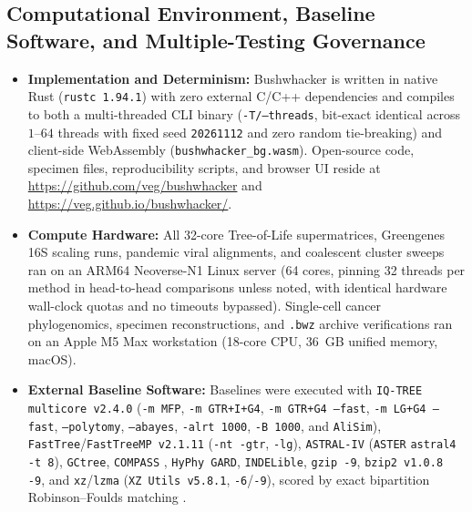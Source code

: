 \documentclass[12pt]{article}
\begin{document}
\subsection*{Computational Environment, Baseline Software, and Multiple-Testing Governance}

\begin{itemize}
    \item \textbf{Implementation and Determinism:} Bushwhacker is written in native Rust (\texttt{rustc 1.94.1}) with zero external C/C++ dependencies and compiles to both a multi-threaded CLI binary (\texttt{-T/--threads}, bit-exact identical across $1\text{--}64$ threads with fixed seed \texttt{20261112} and zero random tie-breaking) and client-side WebAssembly (\texttt{bushwhacker\_bg.wasm}). Open-source code, specimen files, reproducibility scripts, and browser UI reside at \url{https://github.com/veg/bushwhacker} and \url{https://veg.github.io/bushwhacker/}.
    \item \textbf{Compute Hardware:} All 32-core Tree-of-Life supermatrices, Greengenes 16S scaling runs, pandemic viral alignments, and coalescent cluster sweeps ran on an ARM64 Neoverse-N1 Linux server (64 cores, pinning 32 threads per method in head-to-head comparisons unless noted, with identical hardware wall-clock quotas and no timeouts bypassed). Single-cell cancer phylogenomics, specimen reconstructions, and \texttt{.bwz} archive verifications ran on an Apple M5 Max workstation (18-core CPU, 36~GB unified memory, macOS).
    \item \textbf{External Baseline Software:} Baselines were executed with \texttt{IQ-TREE multicore v2.4.0} (\texttt{-m MFP}, \texttt{-m GTR+I+G4}, \texttt{-m GTR+G4 --fast}, \texttt{-m LG+G4 --fast}, \texttt{--polytomy}, \texttt{--abayes}, \texttt{-alrt 1000}, \texttt{-B 1000}, and \texttt{AliSim}), \texttt{FastTree}/\texttt{FastTreeMP v2.1.11} (\texttt{-nt -gtr}, \texttt{-lg}), \texttt{ASTRAL-IV} (\texttt{ASTER} \texttt{astral4} \texttt{-t 8}), \texttt{GCtree}, \texttt{COMPASS} \cite{sollier2023compass,jahn2016tree}, \texttt{HyPhy GARD}, \texttt{INDELible}, \texttt{gzip -9}, \texttt{bzip2 v1.0.8 -9}, and \texttt{xz}/\texttt{lzma} (\texttt{XZ Utils v5.8.1}, \texttt{-6}/\texttt{-9}), scored by exact bipartition Robinson--Foulds matching \cite{robinson1981comparison}.

\end{itemize}
\end{document}
